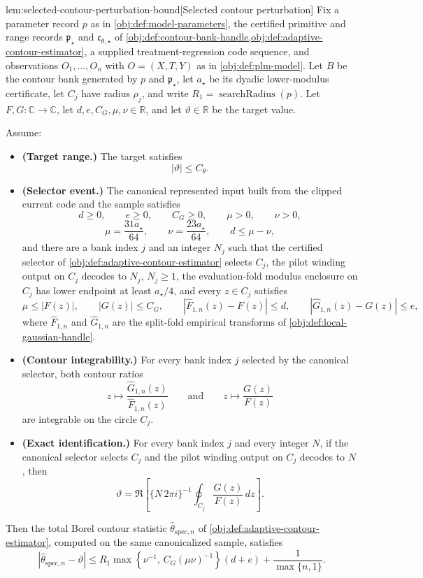 \documentclass[11pt]{article}
\begin{document}
\begin{lemmav}{lem:selected-contour-perturbation-bound}[Selected contour perturbation]
Fix a parameter record \(p\) as in \cref{obj:def:model-parameters}, the certified primitive and range records \(\mathfrak p_{\star}\) and \(\mathfrak c_{\theta,\star}\) of \cref{obj:def:contour-bank-handle,obj:def:adaptive-contour-estimator}, a supplied treatment-regression code sequence, and observations \(O_1,\ldots,O_n\) with \(O=(X,T,Y)\) as in \cref{obj:def:plm-model}.  Let \(B\) be the contour bank generated by \(p\) and \(\mathfrak p_{\star}\), let \(a_{\star}\) be its dyadic lower-modulus certificate, let \(C_j\) have radius \(\rho_j\), and write \(R_1=\operatorname{searchRadius}(p)\).  Let \(F,G:\mathbb C\to\mathbb C\), let \(d,e,C_G,\mu,\nu\in\mathbb R\), and let \(\vartheta\in\mathbb R\) be the target value.

Assume:
\begin{itemize}
\item \textbf{(Target range.)} The target satisfies
\[
|\vartheta|\le C_{\theta}.
\]
\item \textbf{(Selector event.)} The canonical represented input built from the clipped current code and the sample satisfies
\[
d\ge0,\qquad e\ge0,\qquad C_G\ge0,\qquad \mu>0,\qquad \nu>0,
\]
\[
\mu=\frac{31a_{\star}}{64},\qquad \nu=\frac{23a_{\star}}{64},\qquad d\le \mu-\nu,
\]
and there are a bank index \(j\) and an integer \(N_j\) such that the certified selector of \cref{obj:def:adaptive-contour-estimator} selects \(C_j\), the pilot winding output on \(C_j\) decodes to \(N_j\), \(N_j\ge1\), the evaluation-fold modulus enclosure on \(C_j\) has lower endpoint at least \(a_{\star}/4\), and every \(z\in C_j\) satisfies
\[
\mu\le |F(z)|,\qquad |G(z)|\le C_G,\qquad
|\widehat F_{1,n}(z)-F(z)|\le d,\qquad
|\widehat G_{1,n}(z)-G(z)|\le e,
\]
where \(\widehat F_{1,n}\) and \(\widehat G_{1,n}\) are the split-fold empirical transforms of \cref{obj:def:local-gaussian-handle}.
\item \textbf{(Contour integrability.)} For every bank index \(j\) selected by the canonical selector, both contour ratios
\[
z\mapsto \frac{\widehat G_{1,n}(z)}{\widehat F_{1,n}(z)}
\qquad\text{and}\qquad
z\mapsto \frac{G(z)}{F(z)}
\]
are integrable on the circle \(C_j\).
\item \textbf{(Exact identification.)} For every bank index \(j\) and every integer \(N\), if the canonical selector selects \(C_j\) and the pilot winding output on \(C_j\) decodes to \(N\), then
\[
\vartheta
=
\Re\left[
\{N\,2\pi i\}^{-1}
\oint_{C_j}\frac{G(z)}{F(z)}\,dz
\right].
\]
\end{itemize}
Then the total Borel contour statistic \(\widehat\theta_{\mathrm{spec},n}\) of \cref{obj:def:adaptive-contour-estimator}, computed on the same canonicalized sample, satisfies
\[
\left|\widehat\theta_{\mathrm{spec},n}-\vartheta\right|
\le
R_1\max\left\{\nu^{-1},\,C_G(\mu\nu)^{-1}\right\}(d+e)
+
\frac{1}{\max\{n,1\}}.
\]
\end{lemmav}
\end{document}
